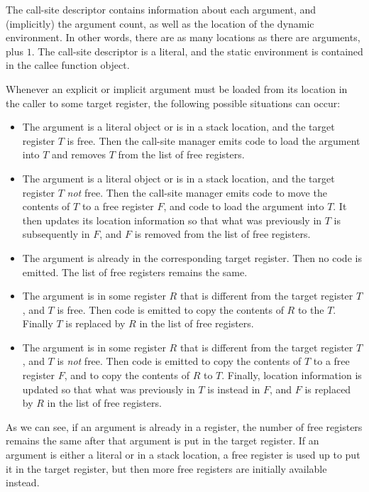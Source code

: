 The call-site descriptor contains information about each argument, and
(implicitly) the argument count, as well as the location of the
dynamic environment.  In other words, there are as many locations as
there are arguments, plus $1$. The call-site descriptor is a literal,
and the static environment is contained in the callee function object.

Whenever an explicit or implicit argument must be loaded from its
location in the caller to some target register, the following possible
situations can occur:

\begin{itemize}
\item The argument is a literal object or is in a stack location, and
  the target register $T$ is free.  Then the call-site manager emits
  code to load the argument into $T$ and removes $T$ from the list of
  free registers.
\item The argument is a literal object or is in a stack location, and
  the target register $T$ \emph{not} free.  Then the call-site manager
  emits code to move the contents of $T$ to a free register $F$, and
  code to load the argument into $T$.  It then updates its location
  information so that what was previously in $T$ is subsequently in
  $F$, and $F$ is removed from the list of free registers.
\item The argument is already in the corresponding target register.
  Then no code is emitted.  The list of free registers remains the
  same.
\item The argument is in some register $R$ that is different from the
  target register $T$, and $T$ is free.  Then code is emitted to copy
  the contents of $R$ to the $T$.  Finally $T$ is replaced by $R$ in
  the list of free registers.
\item The argument is in some register $R$ that is different from the
  target register $T$, and $T$ is \emph{not} free.  Then code is
  emitted to copy the contents of $T$ to a free register $F$, and to
  copy the contents of $R$ to $T$.  Finally, location information is
  updated so that what was previously in $T$ is instead in $F$, and
  $F$ is replaced by $R$ in the list of free registers.
\end{itemize}

As we can see, if an argument is already in a register, the number of
free registers remains the same after that argument is put in the
target register.  If an argument is either a literal or in a stack
location, a free register is used up to put it in the target register,
but then more free registers are initially available instead.

